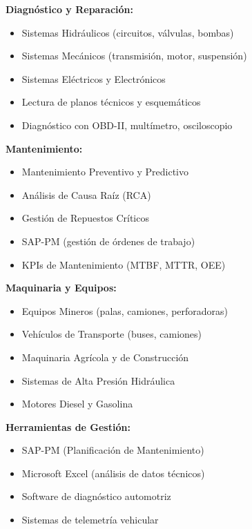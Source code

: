 \documentclass[10pt,letterpaper]{article}
\begin{document}
\noindent
\begin{minipage}[t]{0.48\textwidth}
\textbf{Diagnóstico y Reparación:}
\begin{itemize}
    \item Sistemas Hidráulicos (circuitos, válvulas, bombas)
    \item Sistemas Mecánicos (transmisión, motor, suspensión)
    \item Sistemas Eléctricos y Electrónicos
    \item Lectura de planos técnicos y esquemáticos
    \item Diagnóstico con OBD-II, multímetro, osciloscopio
\end{itemize}

\vspace{0.2cm}

\textbf{Mantenimiento:}
\begin{itemize}
    \item Mantenimiento Preventivo y Predictivo
    \item Análisis de Causa Raíz (RCA)
    \item Gestión de Repuestos Críticos
    \item SAP-PM (gestión de órdenes de trabajo)
    \item KPIs de Mantenimiento (MTBF, MTTR, OEE)
\end{itemize}
\end{minipage}
\hfill
\begin{minipage}[t]{0.48\textwidth}
\textbf{Maquinaria y Equipos:}
\begin{itemize}
    \item Equipos Mineros (palas, camiones, perforadoras)
    \item Vehículos de Transporte (buses, camiones)
    \item Maquinaria Agrícola y de Construcción
    \item Sistemas de Alta Presión Hidráulica
    \item Motores Diesel y Gasolina
\end{itemize}

\vspace{0.2cm}

\textbf{Herramientas de Gestión:}
\begin{itemize}
    \item SAP-PM (Planificación de Mantenimiento)
    \item Microsoft Excel (análisis de datos técnicos)
    \item Software de diagnóstico automotriz
    \item Sistemas de telemetría vehicular
\end{itemize}
\end{minipage}
\end{document}
